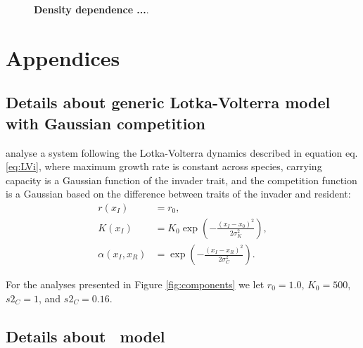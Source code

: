 \documentclass[a4paper,11pt]{article}
\begin{document}
\begin{figure}[h]
  \centering
  \caption{\textbf{Density dependence
  ...}.
  \label{fig:dd}}
\end{figure}

\clearpage




\section{Appendices}

\subsection{Details about generic Lotka-Volterra model with
Gaussian competition}\label{sec:DD99}

\citet{Dieckmann-1999} analyse a system following the Lotka-Volterra dynamics
described in equation eq. \ref{eq:LVi}, where maximum growth rate is constant
across species, carrying capacity is a Gaussian
function of the invader trait, and the competition function is a Gaussian
based on the difference between traits of the invader and resident:
\begin{subequations}
\begin{align}
\label{eq:DD}
r(x_I) &= r_0, \\
K(x_I) &= K_0 \exp\left(-\frac{\left(x_I-x_0\right)^2}{2\sigma^2_K}\right),\\
\alpha(x_I, x_R) &= \exp\left(-\frac{\left(x_I-x_R\right)^2}{2\sigma^2_C}\right).
\end{align}
\end{subequations}

For the analyses presented in Figure \ref{fig:components} we let $r_0=1.0$, $K_0=500$,
 $s2_C=1$, and $s2_C=0.16$.

\subsection{Details about \Rstar\ model}\label{sec:Rstar}
\end{document}
